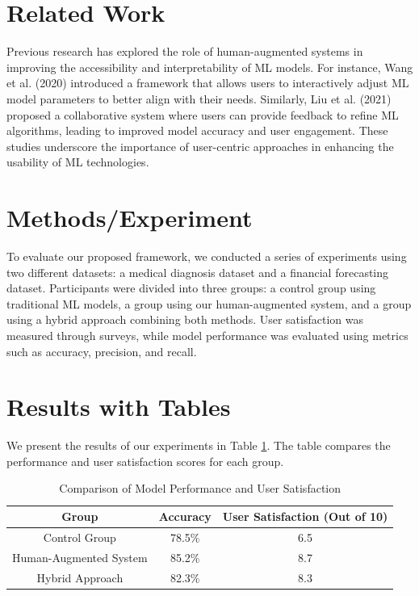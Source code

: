 \section{Related Work}
Previous research has explored the role of human-augmented systems in improving the accessibility and interpretability of ML models. For instance, Wang et al. (2020) introduced a framework that allows users to interactively adjust ML model parameters to better align with their needs. Similarly, Liu et al. (2021) proposed a collaborative system where users can provide feedback to refine ML algorithms, leading to improved model accuracy and user engagement. These studies underscore the importance of user-centric approaches in enhancing the usability of ML technologies.

\section{Methods/Experiment}
To evaluate our proposed framework, we conducted a series of experiments using two different datasets: a medical diagnosis dataset and a financial forecasting dataset. Participants were divided into three groups: a control group using traditional ML models, a group using our human-augmented system, and a group using a hybrid approach combining both methods. User satisfaction was measured through surveys, while model performance was evaluated using metrics such as accuracy, precision, and recall.

\section{Results with Tables}
We present the results of our experiments in Table \ref{tab:results}. The table compares the performance and user satisfaction scores for each group.

\begin{table}[htbp]
\centering
\caption{Comparison of Model Performance and User Satisfaction}
\label{tab:results}
\begin{tabular}{|c|c|c|}
\hline
\textbf{Group} & \textbf{Accuracy} & \textbf{User Satisfaction (Out of 10)} \\
\hline
Control Group & 78.5\% & 6.5 \\
Human-Augmented System & 85.2\% & 8.7 \\
Hybrid Approach & 82.3\% & 8.3 \\
\hline
\end{tabular}
\end{table}


